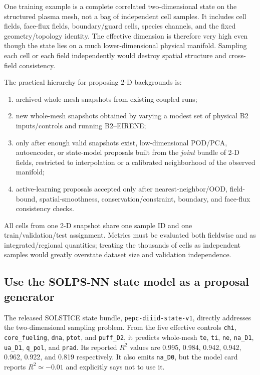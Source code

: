 \documentclass[11pt]{article}
\begin{document}
One training example is a complete correlated two-dimensional state on the structured plasma mesh, not a bag of independent cell samples. It includes cell fields, face-flux fields, boundary/guard cells, species channels, and the fixed geometry/topology identity. The effective dimension is therefore very high even though the state lies on a much lower-dimensional physical manifold. Sampling each cell or each field independently would destroy spatial structure and cross-field consistency.

The practical hierarchy for proposing 2-D backgrounds is:

\begin{enumerate}
\item archived whole-mesh snapshots from existing coupled runs;
\item new whole-mesh snapshots obtained by varying a modest set of physical B2 inputs/controls and running B2--EIRENE;
\item only after enough valid snapshots exist, low-dimensional POD/PCA, autoencoder, or state-model proposals built from the \emph{joint} bundle of 2-D fields, restricted to interpolation or a calibrated neighborhood of the observed manifold;
\item active-learning proposals accepted only after nearest-neighbor/OOD, field-bound, spatial-smoothness, conservation/constraint, boundary, and face-flux consistency checks.
\end{enumerate}

All cells from one 2-D snapshot share one sample ID and one train/validation/test assignment. Metrics must be evaluated both fieldwise and as integrated/regional quantities; treating the thousands of cells as independent samples would greatly overstate dataset size and validation independence.

\subsection{Use the SOLPS-NN state model as a proposal generator}

The released SOLSTICE state bundle, \texttt{pepc-diiid-state-v1}, directly addresses the two-dimensional sampling problem. From the five effective controls \texttt{chi}, \texttt{core\_fueling}, \texttt{dna}, \texttt{ptot}, and \texttt{puff\_D2}, it predicts whole-mesh \texttt{te}, \texttt{ti}, \texttt{ne}, \texttt{na\_D1}, \texttt{ua\_D1}, \texttt{q\_pol}, and \texttt{prad}. Its reported $R^2$ values are 0.995, 0.984, 0.942, 0.942, 0.962, 0.922, and 0.819 respectively. It also emits \texttt{na\_D0}, but the model card reports $R^2\simeq-0.01$ and explicitly says not to use it.
\end{document}
